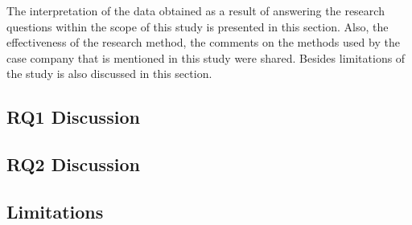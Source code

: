The interpretation of the data obtained as a result of answering the research questions within the scope of this study is presented in this section. Also, the effectiveness of the research method, the comments on the methods used by the case company that is mentioned in this study were shared. Besides limitations of the study is also discussed in this section.

\subsection{RQ1 Discussion}


\subsection{RQ2 Discussion}


\subsection{Limitations}
